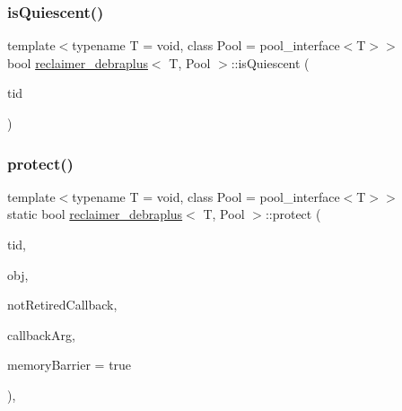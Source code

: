 \subsubsection{\texorpdfstring{is\+Quiescent()}{isQuiescent()}}
{\footnotesize\ttfamily template$<$typename T  = void, class Pool  = pool\+\_\+interface$<$\+T$>$$>$ \\
bool \hyperlink{classreclaimer__debraplus}{reclaimer\+\_\+debraplus}$<$ T, Pool $>$\+::is\+Quiescent (\begin{DoxyParamCaption}\item[{const int}]{tid }\end{DoxyParamCaption})\hspace{0.3cm}{\ttfamily [inline]}}

\mbox{\label{classreclaimer__debraplus_a79d06813ec16076bc9ea53b810b49951}} 
\subsubsection{\texorpdfstring{protect()}{protect()}}
{\footnotesize\ttfamily template$<$typename T  = void, class Pool  = pool\+\_\+interface$<$\+T$>$$>$ \\
static bool \hyperlink{classreclaimer__debraplus}{reclaimer\+\_\+debraplus}$<$ T, Pool $>$\+::protect (\begin{DoxyParamCaption}\item[{const int}]{tid,  }\item[{T $\ast$const}]{obj,  }\item[{\hyperlink{globals_8h_a57f5c0d40b156d7d996492fb2f16e3cd}{Callback\+Type}}]{not\+Retired\+Callback,  }\item[{\hyperlink{globals_8h_a3de64ef48066ac6430631c8b81a15345}{Callback\+Arg}}]{callback\+Arg,  }\item[{bool}]{memory\+Barrier = {\ttfamily true} }\end{DoxyParamCaption})\hspace{0.3cm}{\ttfamily [inline]}, {\ttfamily [static]}}

\mbox{\label{classreclaimer__debraplus_ad32af3b2be631a1bf8121f3ec92e8c80}} 
